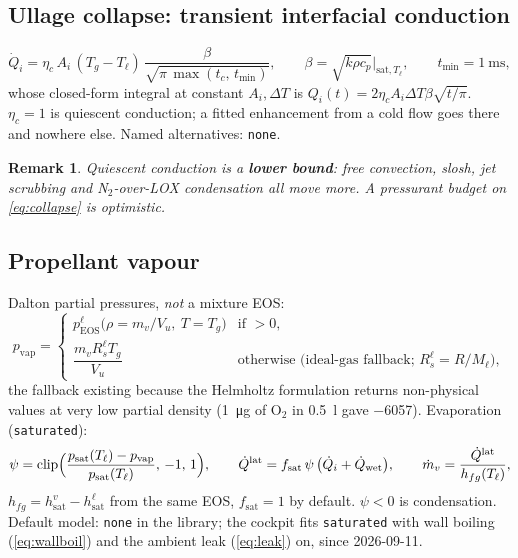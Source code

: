 \documentclass[11pt,a4paper]{article}
\newtheorem{remark}{Remark}
\newcommand{\mdot}{\dot{m}}
\newcommand{\Qdot}{\dot{Q}}
\newcommand{\code}[1]{\texttt{#1}}
\begin{document}
\subsection{Ullage collapse: transient interfacial conduction}\label{sec:collapse}
\begin{equation}
  \Qdot_i = \eta_c\,A_i\,(T_g-T_\ell)\,\frac{\beta}{\sqrt{\pi\,\max(t_c,\,t_{\min})}},
  \qquad \beta=\sqrt{k\rho c_p}\Big|_{\mathrm{sat},T_\ell},\qquad t_{\min}=\SI{1}{\milli\second},
  \label{eq:collapse}
\end{equation}
whose closed-form integral at constant $A_i,\Delta T$ is $Q_i(t)=2\eta_cA_i\Delta T\beta\sqrt{t/\pi}$.
$\eta_c=1$ is quiescent conduction; a fitted enhancement from a cold flow goes
there and nowhere else. Named alternatives: \code{none}.
\begin{remark}
Quiescent conduction is a \textbf{lower bound}: free convection, slosh, jet
scrubbing and N$_2$-over-LOX condensation all move more. A pressurant budget on
\cref{eq:collapse} is optimistic.
\end{remark}

\subsection{Propellant vapour}\label{sec:vapour}
Dalton partial pressures, \emph{not} a mixture EOS:
\begin{equation}
  p_{\mathrm{vap}} = \begin{cases}
    p^{\ell}_{\mathrm{EOS}}\bigl(\rho=m_v/V_u,\ T=T_g\bigr) & \text{if }>0,\\
    \dfrac{m_v R_s^{\ell}T_g}{V_u} & \text{otherwise (ideal-gas fallback; } R_s^\ell = R/M_\ell),
  \end{cases}
\end{equation}
the fallback existing because the Helmholtz formulation returns non-physical
values at very low partial density (\SI{1}{\micro\gram} of O$_2$ in
\SI{0.5}{\litre} gave \SI{-6057}{\psi}). Evaporation (\code{saturated}):
\begin{equation}
  \psi = \mathrm{clip}\Bigl(\frac{p_{\mathrm{sat}}(T_\ell)-p_{\mathrm{vap}}}{p_{\mathrm{sat}}(T_\ell)},\,-1,\,1\Bigr),\qquad
  \Qdot^{\mathrm{lat}} = f_{\mathrm{sat}}\,\psi\,\bigl(\Qdot_i+\Qdot_{\mathrm{wet}}\bigr),\qquad
  \mdot_v = \frac{\Qdot^{\mathrm{lat}}}{h_{fg}(T_\ell)},
  \label{eq:evap}
\end{equation}
$h_{fg}=h_{\mathrm{sat}}^v-h_{\mathrm{sat}}^\ell$ from the same EOS, $f_{\mathrm{sat}}=1$
by default. $\psi<0$ is condensation. Default model: \code{none} in the library; the cockpit fits \code{saturated} with wall boiling (\cref{eq:wallboil}) and the ambient leak (\cref{eq:leak}) on, since 2026-09-11.
\end{document}
